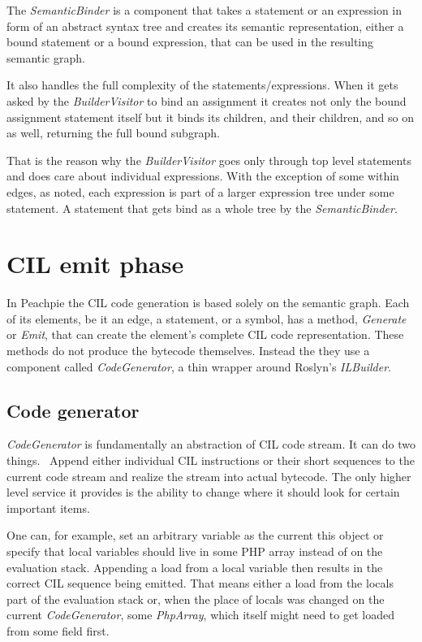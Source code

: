 The \emph{SemanticBinder} is a component that takes a statement or an expression in form of an abstract syntax tree and creates its semantic representation, either a bound statement or a bound expression, that can be used in the resulting semantic graph. 

It also handles the full complexity of the statements/expressions. When it gets asked by the \emph{BuilderVisitor} to bind an assignment it creates not only the bound assignment statement itself but it binds its children, and their children, and so on as well, returning the full bound subgraph. 

That is the reason why the \emph{BuilderVisitor} goes only through top level statements and does care about individual expressions. With the exception of some within edges, as noted, each expression is part of a larger expression tree under some statement. A statement that gets bind as a whole tree by the \emph{SemanticBinder}. 

\section{CIL emit phase}

In Peachpie the CIL code generation is based solely on the semantic graph. Each of its elements, be it an edge, a statement, or a symbol, has a method, \emph{Generate} or \emph{Emit}, that can create the element’s complete CIL code representation. These methods do not produce the bytecode themselves. Instead the they use a component called \emph{CodeGenerator}, a thin wrapper around Roslyn’s \emph{ILBuilder}.


\subsection{Code generator}
\emph{CodeGenerator} is fundamentally an abstraction of CIL code stream. It can do two things.  Append either individual CIL instructions or their short sequences to the current code stream and realize the stream into actual bytecode. The only higher level service it provides is the ability to change where it should look for certain important items.

One can, for example, set an arbitrary variable as the current this object or specify that local variables should live in some PHP array instead of on the evaluation stack. Appending a load from a local variable then results in the correct CIL sequence being emitted. That means either a load from the locals part of the evaluation stack or, when the place of locals was changed on the current \emph{CodeGenerator}, some \emph{PhpArray}, which itself might need to get loaded from some field first. 

